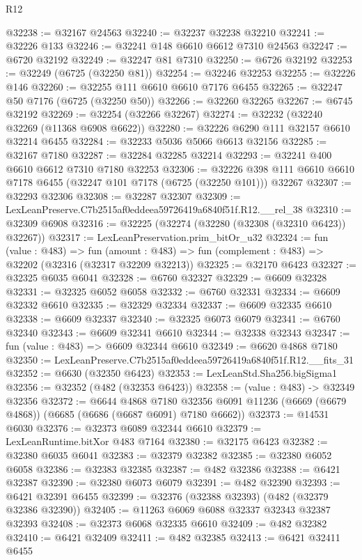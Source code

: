 \begin{lexlean}{R12}
\begin{coremodule}
@32238 := @32167 @24563
@32240 := @32237 @32238 @32210
@32241 := @32226 @133
@32246 := @32241 @148 @6610 @6612 @7310 @24563
@32247 := @6720 @32192
@32249 := @32247 @81 @7310
@32250 := @6726 @32192
@32253 := @32249 (@6725 (@32250 @81))
@32254 := @32246 @32253
@32255 := @32226 @146
@32260 := @32255 @111 @6610 @6610 @7176 @6455
@32265 := @32247 @50 @7176 (@6725 (@32250 @50))
@32266 := @32260 @32265
@32267 := @6745 @32192
@32269 := @32254 (@32266 @32267)
@32274 := @32232 (@32240 @32269 (@11368 @6908 @6622))
@32280 := @32226 @6290 @111 @32157 @6610 @32214 @6455
@32284 := @32233 @5036 @5066 @6613 @32156
@32285 := @32167 @7180
@32287 := @32284 @32285 @32214
@32293 := @32241 @400 @6610 @6612 @7310 @7180 @32253
@32306 := @32226 @398 @111 @6610 @6610 @7178 @6455 (@32247 @101 @7178 (@6725 (@32250 @101))) @32267
@32307 := @32293 @32306
@32308 := @32287 @32307
@32309 := LexLeanPreserve.C7b2515af0eddeea59726419a6840f51f.R12.__rel_38
@32310 := @32309 @6908
@32316 := @32225 (@32274 (@32280 (@32308 (@32310 @6423)) @32267))
@32317 := LexLeanPreservation.prim_bitOr_u32
@32324 := fun (value : @483) =>
  fun (amount : @483) => fun (complement : @483) => @32202 (@32316 (@32317 @32209 @32213))
@32325 := @32170 @6423
@32327 := @32325 @6035 @6041
@32328 := @6760 @32327
@32329 := @6609 @32328
@32331 := @32325 @6052 @6058
@32332 := @6760 @32331
@32334 := @6609 @32332 @6610
@32335 := @32329 @32334
@32337 := @6609 @32335 @6610
@32338 := @6609 @32337
@32340 := @32325 @6073 @6079
@32341 := @6760 @32340
@32343 := @6609 @32341 @6610
@32344 := @32338 @32343
@32347 := fun (value : @483) => @6609 @32344 @6610
@32349 := @6620 @4868 @7180
@32350 := LexLeanPreserve.C7b2515af0eddeea59726419a6840f51f.R12.__fits_31
@32352 := @6630 (@32350 @6423)
@32353 := LexLeanStd.Sha256.bigSigma1
@32356 := @32352 (@482 (@32353 @6423))
@32358 := (value : @483) -> @32349 @32356
@32372 := @6644
    @4868
    @7180
    @32356
    @6091
    @11236
    (@6669 (@6679 @4868))
    (@6685 (@6686 (@6687 @6091) @7180 @6662))
@32373 := @14531 @6030
@32376 := @32373 @6089 @32344 @6610
@32379 := LexLeanRuntime.bitXor @483 @7164
@32380 := @32175 @6423
@32382 := @32380 @6035 @6041
@32383 := @32379 @32382
@32385 := @32380 @6052 @6058
@32386 := @32383 @32385
@32387 := @482 @32386
@32388 := @6421 @32387
@32390 := @32380 @6073 @6079
@32391 := @482 @32390
@32393 := @6421 @32391 @6455
@32399 := @32376 (@32388 @32393) (@482 (@32379 @32386 @32390))
@32405 := @11263 @6069 @6088 @32337 @32343 @32387 @32393
@32408 := @32373 @6068 @32335 @6610
@32409 := @482 @32382
@32410 := @6421 @32409
@32411 := @482 @32385
@32413 := @6421 @32411 @6455

\end{coremodule}
\end{lexlean}
